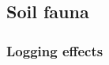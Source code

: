


\subsection*{Soil fauna}
\label{disc:soil_fauna}


\subsubsection*{Logging effects}
\label{disc:logging_effects}


